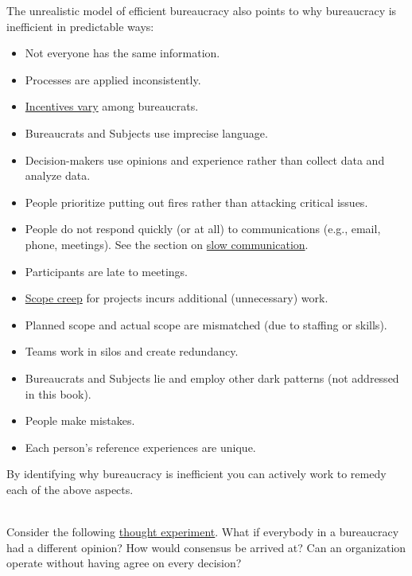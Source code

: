 The unrealistic model of efficient bureaucracy also points to why bureaucracy is inefficient in predictable ways:
\begin{itemize}
    \item Not everyone has the same information.
    \item Processes are applied inconsistently.
    \item \hyperref[sec:motivations]{Incentives vary} among bureaucrats.
    \item Bureaucrats and Subjects use imprecise language.
    \item Decision-makers use opinions and experience rather than collect data and analyze data.
    \item People prioritize putting out fires rather than attacking critical issues.
    \item People do not respond quickly (or at all) to communications (e.g., email, phone, meetings). See the section on \hyperref[sec:slowing-communication]{slow communication}.
    \item Participants are late to meetings.
    \item \hyperref[sec:scope-creep]{Scope creep} 
    for projects incurs additional (unnecessary) work.
    \item Planned scope and actual scope are mismatched  (due to staffing or skills).
    \item Teams work in silos and create redundancy.
    \item Bureaucrats and Subjects lie and employ other dark patterns (not addressed in this book).
    \item People make mistakes.
    \item Each person's reference experiences are unique.
\end{itemize}
By identifying why bureaucracy is inefficient you can actively work to remedy each of the above aspects. 

\ \\

Consider the following 
\href{https://en.wikipedia.org/wiki/Thought_experiment}{thought experiment}. 
What if everybody in a bureaucracy had a different opinion? How would consensus be arrived at? Can an organization operate without having agree on every decision? 



